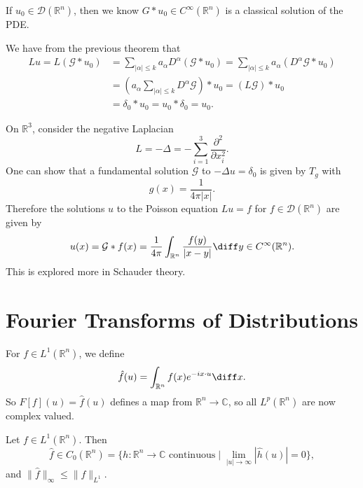 \documentclass[12pt]{article}
\begin{document}
\begin{remark}
	If $u_0 \in \mathcal{D}(\mathbb{R}^n)$, then we know $G \ast u_0 \in C^\infty(\mathbb{R}^n)$ is a classical solution of the PDE.
\end{remark}

\begin{proofbox}
	We have from the previous theorem that
	\begin{align*}
		Lu = L(\mathcal{G} \ast u_0) &= \sum_{|\alpha| \leq k} a_\alpha D^\alpha (\mathcal{G} \ast u_0) = \sum_{|\alpha| \leq k}a_\alpha (D^\alpha \mathcal{G} \ast u_0) \\
					     &= \left( a_\alpha \sum_{|\alpha| \leq k} D^\alpha \mathcal{G} \right) \ast u_0 = (L \mathcal{G}) \ast u_0 \\
					     &= \delta_0 \ast u_0 = u_0 \ast \delta_0 = u_0.
	\end{align*}
\end{proofbox}

\begin{exbox}
	On $\mathbb{R}^3$, consider the negative Laplacian 
	\[
	L = - \Delta = - \sum_{i = 1}^3 \frac{\partial^2}{\partial x_i^2}.
	\]
	One can show that a fundamental solution $\mathcal{G}$ to $-\Delta u = \delta_0$ is given by $T_g$ with
	\[
	g(x) = \frac{1}{4 \pi |x|}.
	\]
	Therefore the solutions $u$ to the Poisson equation $Lu = f$ for $f \in \mathcal{D}(\mathbb{R}^n)$ are given by
	\[
	u(x) = \mathcal{G} \ast f(x) = \frac{1}{4 \pi} \int_{\mathbb{R}^n} \frac{f(y)}{|x - y|}\diff y \in C^\infty(\mathbb{R}^n).
	\]
	This is explored more in Schauder theory.
\end{exbox}

\newpage

\section{Fourier Transforms of Distributions}
\label{sec:ft_dist}

For $f \in L^1(\mathbb{R}^n)$, we define
\[
\hat f(u) = \int_{\mathbb{R}^n} f(x) e^{-i x \cdot u} \diff x.
\]
So $F[f](u) = \hat f(u)$ defines a map from $\mathbb{R}^n \to \mathbb{C}$, so all $L^p(\mathbb{R}^n)$ are now complex valued.

\begin{lemma}
	Let $f \in L^1(\mathbb{R}^n)$. Then
	\[
		\hat f \in C_0(\mathbb{R}^n) = \{ h : \mathbb{R}^n \to \mathbb{C} \text{ continuous} \mid \lim_{|u| \to \infty} |\hat h(u)| = 0\},
	\]
	and $\|\hat f\|_\infty \leq \|f\|_{L^1}$.
\end{lemma}
\end{document}
